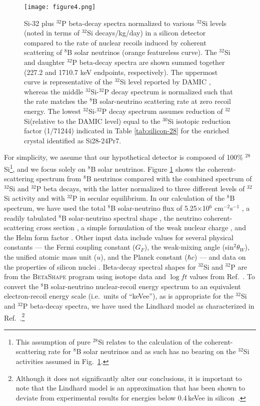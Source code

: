 \documentclass[final,5p]{elsarticle}
\def\si{$^{32}$Si\xspace}
\def\p{$^{32}$P\xspace}
\def\esi{$^{28}$Si\xspace}
\begin{document}
\begin{figure}[!t]
\centering
\texttt{[image: figure4.png]}
\caption{\small Si-32 plus \p beta-decay spectra normalized to various \si levels (noted in terms of \si decays/kg/day) in a silicon detector compared to the rate of nuclear recoils induced by coherent scattering of $^8$B solar neutrinos (orange featureless curve). The \si and daughter \p beta-decay spectra are shown summed together (227.2 and 1710.7 keV endpoints, respectively). The uppermost curve is representative of the \si level reported by DAMIC \cite{damic_backgrounds}, whereas the middle \si-\p decay spectrum is normalized such that the rate matches the $^8$B solar-neutrino scattering rate at zero recoil energy. The lowest \si-\p decay spectrum assumes reduction of \si (relative to the DAMIC level) equal to the $^{30}$Si isotopic reduction factor (1/71244) indicated in Table \ref{tab:silicon-28} for the enriched crystal identified as Si28-24Pr7.} 
\label{fig:floor}
\end{figure}

For simplicity, we assume that our hypothetical detector is composed of 100\% \esi\footnote{This assumption of pure \esi relates to the calculation of the coherent-scattering rate for $^{8}$B solar neutrinos and as such has no bearing on the \si activities assumed in Fig.\ \ref{fig:floor}. }, and we focus solely on $^8$B solar neutrinos. Figure \ref{fig:floor} shows the coherent-scattering spectrum from $^8$B neutrinos compared with the combined spectrum of \si and \p beta decays, with the latter normalized to three different levels of \si activity and with \p in secular equilibrium. In our calculation of the $^8$B spectrum, we have used the total $^8$B solar-neutrino flux of 5.25$\times$10$^6$ cm$^{-2}$s$^{-1}$ \cite{sno},  a readily tabulated $^8$B solar-neutrino spectral shape \cite{shape}, the neutrino coherent-scattering cross section \cite{cs1,cs2,cs3}, a simple formulation of the weak nuclear charge \cite{weak_charge}, and the Helm form factor \cite{helm}. Other input data include values for several physical constants --- the Fermi coupling constant ($G_{F}$), the weak-mixing angle (sin$^2$$\theta_{W}$), the unified atomic mass unit ($u$), and the Planck constant ($\hbar$$c$) \cite{pdg} --- and data on the properties of silicon nuclei \cite{snuc1,snuc2}. Beta-decay spectral shapes for \si and \p are from the \textsc{BetaShape} program \cite{betashape,betashape2} 
using isotope data and $\log ft$ values from Ref.\ \cite{nndc_page}. To convert the $^8$B solar-neutrino nuclear-recoil energy spectrum to an equivalent electron-recoil energy scale (i.e.\ units of ``keVee''), as is appropriate for the \si and \p beta-decay spectra, we have used the Lindhard model \cite{lindhard} as characterized in Ref.\ \cite{mei_lindhard}.\footnote{Although it does not significantly alter our conclusions, it is important to note that the Lindhard model is an approximation that has been shown to deviate from experimental results for energies below 0.4\,keVee in silicon~\cite{damic_photoneutron_PRD,photoneutron_jinst}.}
\end{document}
